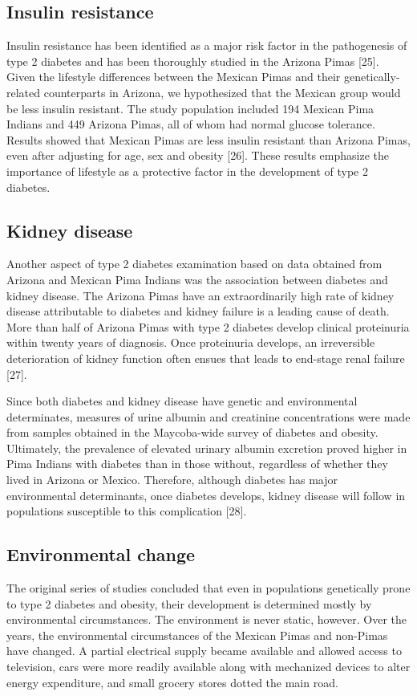 \documentclass[12pt]{article}
\begin{document}
\subsection{Insulin resistance}
Insulin resistance has been identified as a major risk factor in the pathogenesis of type 2 diabetes and has been thoroughly studied in the Arizona Pimas [25]. Given the lifestyle differences between the Mexican Pimas and their genetically-related counterparts in Arizona, we hypothesized that the Mexican group would be less insulin resistant. The study population included 194 Mexican Pima Indians and 449 Arizona Pimas, all of whom had normal glucose tolerance. Results showed that Mexican Pimas are less insulin resistant than Arizona Pimas, even after adjusting for age, sex and obesity [26]. These results emphasize the importance of lifestyle as a protective factor in the development of type 2 diabetes.

\subsection{Kidney disease}
Another aspect of type 2 diabetes examination based on data obtained from Arizona and Mexican Pima Indians was the association between diabetes and kidney disease. The Arizona Pimas have an extraordinarily high rate of kidney disease attributable to diabetes and kidney failure is a leading cause of death. More than half of Arizona Pimas with type 2 diabetes develop clinical proteinuria within twenty years of diagnosis. Once proteinuria develops, an irreversible deterioration of kidney function often ensues that leads to end-stage renal failure [27].

Since both diabetes and kidney disease have genetic and environmental determinates, measures of urine albumin and creatinine concentrations were made from samples obtained in the Maycoba-wide survey of diabetes and obesity. Ultimately, the prevalence of elevated urinary albumin excretion proved higher in Pima Indians with diabetes than in those without, regardless of whether they lived in Arizona or Mexico. Therefore, although diabetes has major environmental determinants, once diabetes develops, kidney disease will follow in populations susceptible to this complication [28].

\subsection{Environmental change}
The original series of studies concluded that even in populations genetically prone to type 2 diabetes and obesity, their development is determined mostly by environmental circumstances. The environment is never static, however. Over the years, the environmental circumstances of the Mexican Pimas and non-Pimas have changed. A partial electrical supply became available and allowed access to television, cars were more readily available along with mechanized devices to alter energy expenditure, and small grocery stores dotted the main road.
\end{document}
